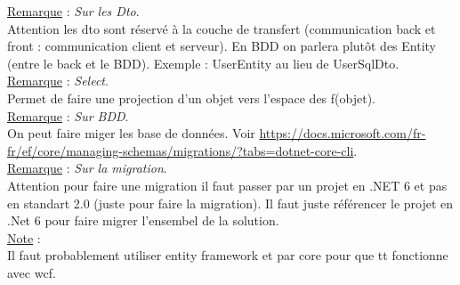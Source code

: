 \documentclass[a4paper,12pt,twoside]{article}
\newcommand{\rem}[2]{\noindent\underline{Remarque} : \textit{#1}.\\ \indent #2}
\newcommand{\note}[1]{\noindent\underline{Note} : \\ \indent #1}
\begin{document}
\rem{Sur les Dto}{Attention les dto sont réservé à la couche de transfert (communication back et front : communication client et serveur). En BDD on parlera plutôt des Entity (entre le back et le BDD). Exemple : UserEntity au lieu de UserSqlDto.}\\

\rem{Select}{Permet de faire une projection d'un objet vers l'espace des f(objet).}\\

\rem{Sur BDD}{On peut faire miger les base de données. Voir \url{https://docs.microsoft.com/fr-fr/ef/core/managing-schemas/migrations/?tabs=dotnet-core-cli}.}\\

\rem{Sur la migration}{Attention pour faire une migration il faut passer par un projet en .NET 6 et pas en standart 2.0 (juste pour faire la migration). Il faut juste référencer le projet en .Net 6 pour faire migrer l'ensembel de la solution.}\\

\note{Il faut probablement utiliser entity framework et par core pour que tt fonctionne avec wcf.}\\

\newpage
\printglossary[type=\acronymtype]%
\glsaddallunused %
\printglossary[type = main,nonumberlist]%
\end{document}
